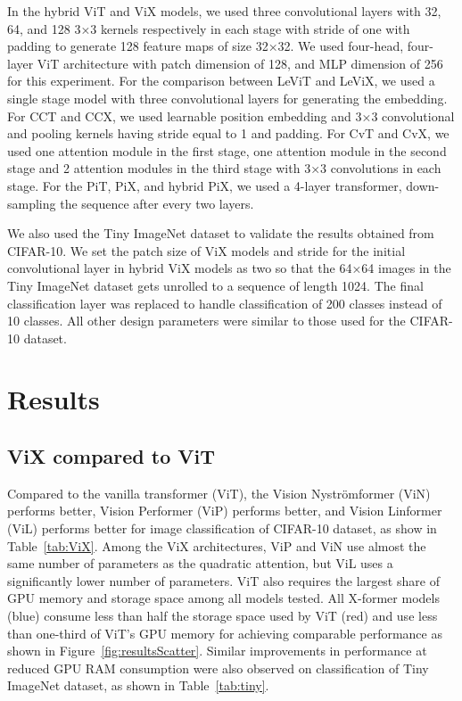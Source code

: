 \documentclass{article}
\begin{document}
In the hybrid ViT and ViX models, we used three convolutional layers with 32, 64, and 128 3×3 kernels respectively in each stage with stride of one with padding to generate 128 feature maps of size 32×32. We used four-head, four-layer ViT architecture with patch dimension of 128, and MLP dimension of 256 for this experiment. For the comparison between LeViT and LeViX, we used a single stage model with three convolutional layers for generating the embedding. For CCT and CCX, we used learnable position embedding and 3×3 convolutional and pooling kernels having stride equal to 1 and padding. For CvT and CvX, we used one attention module in the first stage, one attention module in the second stage and 2 attention modules in the third stage with 3×3 convolutions in each stage. For the PiT, PiX, and hybrid PiX, we used a 4-layer transformer, down-sampling the sequence after every two layers.

We also used the Tiny ImageNet dataset to validate the results obtained from CIFAR-10. We set the patch size of ViX models and stride for the initial convolutional layer in hybrid ViX models as two so that the 64×64 images in the Tiny ImageNet dataset gets unrolled to a sequence of length 1024. The final classification layer was replaced to handle classification of 200 classes instead of 10 classes. All other design parameters were similar to those used for the CIFAR-10 dataset.


\section{Results}


\subsection{ViX compared to ViT}


Compared to the vanilla transformer (ViT), the Vision Nyströmformer (ViN) performs  better, Vision Performer (ViP) performs  better, and Vision Linformer (ViL) performs  better for image classification of CIFAR-10 dataset, as show in Table~\ref{tab:ViX}. Among the ViX architectures, ViP and ViN use almost the same number of parameters as the quadratic attention, but ViL uses a significantly lower number of parameters. ViT also requires the largest share of GPU memory and storage space among all models tested. All X-former models (blue) consume less than half the storage space used by ViT (red) and use less than one-third of ViT's GPU memory for achieving comparable performance as shown in Figure~\ref{fig:resultsScatter}. Similar improvements in performance at reduced GPU RAM consumption were also observed on classification of Tiny ImageNet dataset, as shown in Table~\ref{tab:tiny}. 
\end{document}
